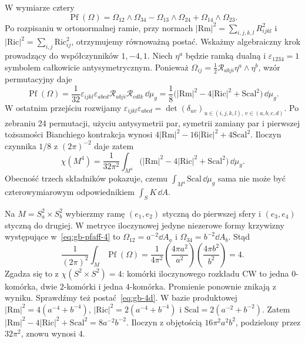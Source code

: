 W wymiarze cztery
\begin{equation}\label{eq:gb-pfaff-4}
 \operatorname{Pf}(\Omega)=
 \Omega_{12}\wedge\Omega_{34}
 -\Omega_{13}\wedge\Omega_{24}
 +\Omega_{14}\wedge\Omega_{23}.
\end{equation}
Po rozpisaniu w ortonormalnej ramie, przy normach
$|\mathrm{Rm}|^2=\sum_{i,j,k,l}R_{ijkl}^2$ i
$|\mathrm{Ric}|^2=\sum_{i,j}\mathrm{Ric}_{ij}^2$,
otrzymujemy równoważną postać. Wskażmy algebraiczny krok
prowadzący do współczynników $1,-4,1$. Niech $\eta^a$
będzie ramką dualną i $\varepsilon_{1234}=1$ symbolem
całkowicie antysymetrycznym. Ponieważ
$\Omega_{ij}=\frac12\mathcal R_{abji}\eta^a\wedge\eta^b$,
wzór permutacyjny daje
\[
 \operatorname{Pf}(\Omega)
 =\frac1{32}\varepsilon_{ijkl}\varepsilon_{abcd}
       \mathcal R_{abji}\mathcal R_{cdlk}\,\dd\mu_g
 =\frac18\bigl(|\mathrm{Rm}|^2-4|\mathrm{Ric}|^2
                         +\mathrm{Scal}^2\bigr)\,\dd\mu_g.
\]
W ostatnim przejściu rozwijamy
$\varepsilon_{ijkl}\varepsilon_{abcd}
=\det(\delta_{u v})_{u\in(i,j,k,l),\,v\in(a,b,c,d)}$.
Po zebraniu 24 permutacji, użyciu antysymetrii par,
symetrii zamiany par i pierwszej tożsamości Bianchiego
kontrakcja wynosi
$4|\mathrm{Rm}|^2-16|\mathrm{Ric}|^2+4\mathrm{Scal}^2$.
Iloczyn czynnika $1/8$ z $(2\pi)^{-2}$ daje zatem
\begin{equation}\label{eq:gb-4d}
 \chi(M^4)=\frac1{32\pi^2}\int_{M^4}
 \bigl(|\mathrm{Rm}|^2-4|\mathrm{Ric}|^2
                    +\mathrm{Scal}^2\bigr)\,\dd\mu_g.
\end{equation}
Obecność trzech składników pokazuje, czemu
$\int_{M^4}\mathrm{Scal}\,\dd\mu_g$ sama nie może być
czterowymiarowym odpowiednikiem $\int_S K\,\dd A$.

\begin{przyklad}
Na $M=S_a^2\times S_b^2$ wybierzmy ramę $(e_1,e_2)$
styczną do pierwszej sfery i $(e_3,e_4)$ styczną do
drugiej. W metryce iloczynowej jedyne niezerowe formy
krzywizny występujące w~\eqref{eq:gb-pfaff-4} to
$\Omega_{12}=a^{-2}\dd A_a$ i
$\Omega_{34}=b^{-2}\dd A_b$. Stąd
\[
 \frac1{(2\pi)^2}\int_M\operatorname{Pf}(\Omega)
 =\frac1{4\pi^2}
   \left(\frac{4\pi a^2}{a^2}\right)
   \left(\frac{4\pi b^2}{b^2}\right)=4.
\]
Zgadza się to z $\chi(S^2\times S^2)=4$:
komórki iloczynowego rozkładu CW to jedna $0$-komórka,
dwie $2$-komórki i jedna $4$-komórka. Promienie ponownie
znikają z wyniku.
Sprawdźmy też postać~\eqref{eq:gb-4d}.
W bazie produktowej $|\mathrm{Rm}|^2=4(a^{-4}+b^{-4})$,
$|\mathrm{Ric}|^2=2(a^{-4}+b^{-4})$ i
$\mathrm{Scal}=2(a^{-2}+b^{-2})$.
Zatem $|\mathrm{Rm}|^2-4|\mathrm{Ric}|^2+\mathrm{Scal}^2
=8a^{-2}b^{-2}$. Iloczyn z objętością
$16\pi^2a^2b^2$, podzielony przez $32\pi^2$,
znowu wynosi $4$.
\end{przyklad}

